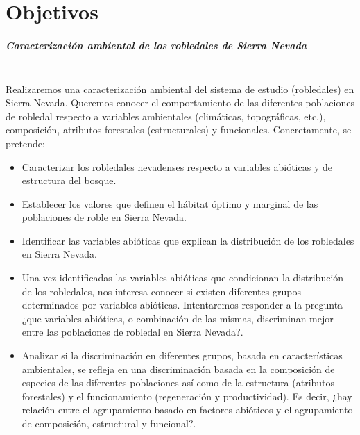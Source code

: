 %
\chapter{Objetivos}
\label{sec:obj}

\paragraph{Caracterización ambiental de los robledales de Sierra Nevada} \mbox{} \\
Realizaremos una caracterización ambiental del sistema de estudio (robledales) en Sierra Nevada. Queremos conocer el comportamiento de las diferentes poblaciones de robledal respecto a variables ambientales (climáticas, topográficas, etc.), composición, atributos forestales (estructurales) y funcionales. Concretamente, se pretende:

\begin{itemize}
	\item Caracterizar los robledales nevadenses respecto a variables abióticas y de estructura del bosque.
	\item Establecer los valores que definen el hábitat óptimo y marginal de las poblaciones de roble en Sierra Nevada.
	\item Identificar las variables abióticas que explican la distribución de los robledales en Sierra Nevada.
	\item Una vez identificadas las variables abióticas que condicionan la distribución de los robledales, nos interesa conocer si existen diferentes grupos determinados por variables abióticas. Intentaremos responder a la pregunta ¿que variables abióticas, o combinación de las mismas, discriminan mejor entre las poblaciones de robledal en Sierra Nevada?.
	\item Analizar si la discriminación en diferentes grupos, basada en características ambientales, se refleja en una discriminación basada en la composición de especies de las diferentes poblaciones así como de la estructura (atributos forestales) y el funcionamiento (regeneración y productividad). Es decir, ¿hay relación entre el agrupamiento basado en factores abióticos y el agrupamiento de composición, estructural y funcional?. 
\end{itemize}


